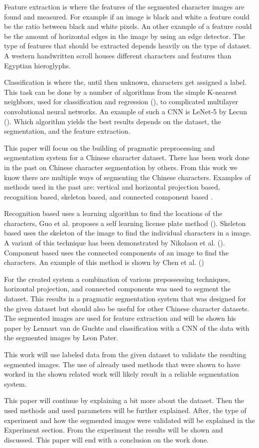 Feature extraction is where the features of the segmented character images are found and measured. For example if an image is black and white a feature could be the ratio between black and white pixels. An other example of a feature could be the amount of horizontal edges in the image by using an edge detector. The type of features that should be extracted depends heavily on the type of dataset. A western handwritten scroll houses different characters and features than Egyptian hieroglyphs.

Classification is where the, until then unknown, characters get assigned a label. This task can be done by a number of algorithms from the simple K-nearest neighbors, used for classification and regression (\cite{knn}), to complicated multilayer convolutional neural networks. An example of such a CNN is LeNet-5 by Lecun (\cite{lecun}). Which algorithm yields the best results depends on the dataset, the segmentation, and the feature extraction.

This paper will focus on the building of pragmatic preprocessing and segmentation system for a Chinese character dataset. There has been work done in the past on Chinese character segmentation by others. From this work we know there are multiple ways of segmenting the Chinese characters. Examples of methods used in the past are: vertical and horizontal projection based, recognition based, skeleton based, and connected component based \cite{Chen1999}.

Recognition based uses a learning algorithm to find the locations of the characters, Guo et al. proposes a self learning license plate method (\cite{recogn}). Skeleton based uses the skeleton of the image to find the individual characters in a image. A variant of this technique has been demonstrated by Nikolaou et al. (\cite{skelet}). Component based uses the connected components of an image to find the characters. An example of this method is shown by Chen et al. (\cite{Chen1999}) 

For the created system a combination of various prepossessing techniques, horizontal projection, and connected components was used to segment the dataset. This results in a pragmatic segmentation system that was designed for the given dataset but should also be useful for other Chinese character datasets. The segmented images are used for feature extraction and will be shown his paper by Lennart van de Guchte and classification with a CNN of the data with the segmented images by Leon Pater.

This work will use labeled data from the given dataset to validate the resulting segmented images. The use of already used methods that were shown to have worked in the shown related work will likely result in a reliable segmentation system.

This paper will continue by explaining a bit more about the dataset. Then the used methods and used parameters will be further explained. After, the type of experiment and how the segmented images were validated will be explained in the Experiment section. From the experiment the results will be shown and discussed. This paper will end with a conclusion on the work done.

